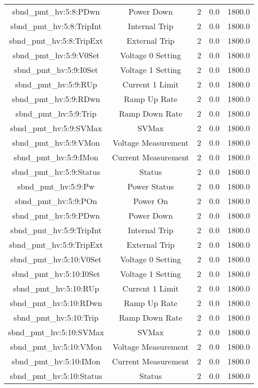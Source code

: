 \begin{table}[ptb]
\begin{tabular}{c | c c c c}
sbnd_pmt_hv:5:8:PDwn & Power Down & 2 & 0.0 & 1800.0\\ 
sbnd_pmt_hv:5:8:TripInt & Internal Trip & 2 & 0.0 & 1800.0\\ 
sbnd_pmt_hv:5:8:TripExt & External Trip & 2 & 0.0 & 1800.0\\ 
sbnd_pmt_hv:5:9:V0Set & Voltage 0 Setting & 2 & 0.0 & 1800.0\\ 
sbnd_pmt_hv:5:9:I0Set & Voltage 1 Setting & 2 & 0.0 & 1800.0\\ 
sbnd_pmt_hv:5:9:RUp & Current 1 Limit & 2 & 0.0 & 1800.0\\ 
sbnd_pmt_hv:5:9:RDwn & Ramp Up Rate & 2 & 0.0 & 1800.0\\ 
sbnd_pmt_hv:5:9:Trip & Ramp Down Rate & 2 & 0.0 & 1800.0\\ 
sbnd_pmt_hv:5:9:SVMax & SVMax & 2 & 0.0 & 1800.0\\ 
sbnd_pmt_hv:5:9:VMon & Voltage Measurement & 2 & 0.0 & 1800.0\\ 
sbnd_pmt_hv:5:9:IMon & Current Measurement & 2 & 0.0 & 1800.0\\ 
sbnd_pmt_hv:5:9:Status & Status & 2 & 0.0 & 1800.0\\ 
sbnd_pmt_hv:5:9:Pw & Power Status & 2 & 0.0 & 1800.0\\ 
sbnd_pmt_hv:5:9:POn & Power On & 2 & 0.0 & 1800.0\\ 
sbnd_pmt_hv:5:9:PDwn & Power Down & 2 & 0.0 & 1800.0\\ 
sbnd_pmt_hv:5:9:TripInt & Internal Trip & 2 & 0.0 & 1800.0\\ 
sbnd_pmt_hv:5:9:TripExt & External Trip & 2 & 0.0 & 1800.0\\ 
sbnd_pmt_hv:5:10:V0Set & Voltage 0 Setting & 2 & 0.0 & 1800.0\\ 
sbnd_pmt_hv:5:10:I0Set & Voltage 1 Setting & 2 & 0.0 & 1800.0\\ 
sbnd_pmt_hv:5:10:RUp & Current 1 Limit & 2 & 0.0 & 1800.0\\ 
sbnd_pmt_hv:5:10:RDwn & Ramp Up Rate & 2 & 0.0 & 1800.0\\ 
sbnd_pmt_hv:5:10:Trip & Ramp Down Rate & 2 & 0.0 & 1800.0\\ 
sbnd_pmt_hv:5:10:SVMax & SVMax & 2 & 0.0 & 1800.0\\ 
sbnd_pmt_hv:5:10:VMon & Voltage Measurement & 2 & 0.0 & 1800.0\\ 
sbnd_pmt_hv:5:10:IMon & Current Measurement & 2 & 0.0 & 1800.0\\ 
sbnd_pmt_hv:5:10:Status & Status & 2 & 0.0 & 1800.0\\ 

\end{tabular}
\end{table}
